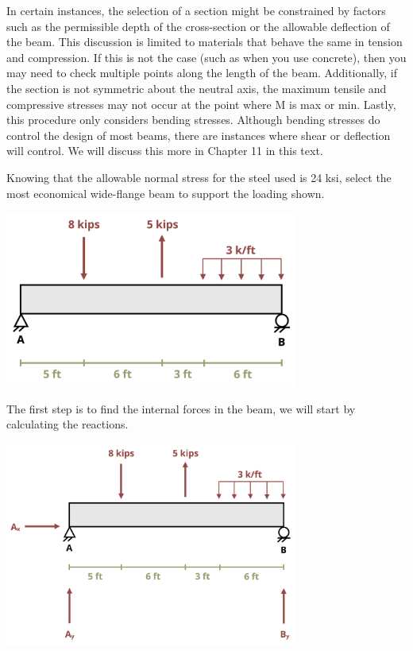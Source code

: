 \documentclass[
  letterpaper,
  DIV=11,
  numbers=noendperiod]{scrreprt}
\begin{document}
In certain instances, the selection of a section might be constrained by
factors such as the permissible depth of the cross-section or the
allowable deflection of the beam. This discussion is limited to
materials that behave the same in tension and compression. If this is
not the case (such as when you use concrete), then you may need to check
multiple points along the length of the beam. Additionally, if the
section is not symmetric about the neutral axis, the maximum tensile and
compressive stresses may not occur at the point where M is max or min.
Lastly, this procedure only considers bending stresses. Although bending
stresses do control the design of most beams, there are instances where
shear or deflection will control. We will discuss this more in Chapter
11 in this text.

\begin{tcolorbox}[enhanced jigsaw, colbacktitle=quarto-callout-note-color!10!white, title={Example 9.3: Design\, of a Standard Steel Section}, coltitle=black, leftrule=.75mm, rightrule=.15mm, opacityback=0, breakable, colframe=quarto-callout-note-color-frame, left=2mm, arc=.35mm, colback=white, bottomrule=.15mm, bottomtitle=1mm, toptitle=1mm, titlerule=0mm, opacitybacktitle=0.6, toprule=.15mm]

Knowing that the allowable normal stress for the steel used is 24 ksi,
select the most economical wide-flange beam to support the loading
shown.

\begin{center}
\includegraphics[width=3.79167in,height=\textheight]{images/CH9 PNGs/Example 9.3 part 1.png}
\end{center}

The first step is to find the internal forces in the beam, we will start
by calculating the reactions.

\begin{center}
\includegraphics[width=3.80208in,height=\textheight]{images/CH9 PNGs/Example 9.3 part 2.png}
\end{center}


\end{tcolorbox}
\end{document}
